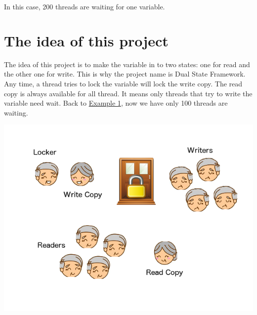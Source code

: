 In this case, 200 threads are waiting for one variable.\hypertarget{_overview_Theideaofthisproject}{}\section{The idea of this project}\label{_overview_Theideaofthisproject}
The idea of this project is to make the variable in to two states\+: one for read and the other one for write. This is why the project name is Dual State Framework. Any time, a thread tries to lock the variable will lock the write copy. The read copy is always available for all thread. It means only threads that try to write the variable need wait. Back to \hyperlink{_overview_eg1}{Example 1}, now we have only 100 threads are waiting. 
\begin{DoxyImageNoCaption}
  \mbox{\includegraphics[width=\textwidth,height=\textheight/2,keepaspectratio=true]{ResearchOverviewTheideaofthisproject.png}}
\end{DoxyImageNoCaption}
 